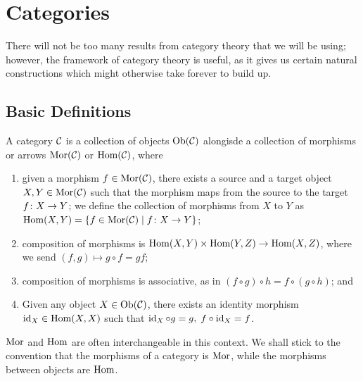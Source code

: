 \chapter{Categories}\label{ch:categories}

\begin{remark}
    There will not be too many results from category theory that we will be using;
    however, the framework of category theory is useful,
    as it gives us certain natural constructions which might otherwise take forever to build up.
\end{remark}

\section{Basic Definitions}

\begin{definition}
    A category \(\mathcal{C}\) is a collection of objects \(\operatorname{Ob}(\mathcal{C})\)
    alongisde a collection of morphisms or arrows \(\operatorname{Mor}(\mathcal{C})\) or \(\operatorname{Hom}(\mathcal{C})\),
    where
    \begin{enumerate}[label={(\roman*)}, itemsep=0mm]
        \item given a morphism \(f \in \operatorname{Mor}(\mathcal{C})\),
            there exists a source and a target object \(X,Y \in \operatorname{Mor}(\mathcal{C})\)
            such that the morphism maps from the source to the target \(f\colon X\to Y\);
            we define the collection of morphisms from \(X\) to \(Y\)
            as \(\operatorname{Hom}(X,Y) = \{f\in\operatorname{Mor}(\mathcal{C}) \mid f\colon X\to Y\}\);
        \item composition of morphisms is \(\operatorname{Hom}(X,Y) \times \operatorname{Hom}(Y,Z) \to \operatorname{Hom}(X,Z)\),
            where we send \((f,g) \mapsto g \circ f = gf\);
        \item composition of morphisms is associative, as in \((f \circ g) \circ h = f \circ (g \circ h)\); and
        \item Given any object \(X \in \operatorname{Ob}(\mathcal{C})\),
            there exists an identity morphism \(\operatorname{id}_X \in \operatorname{Hom}(X,X)\)
            such that \(\operatorname{id}_X \circ g = g,\; f \circ \operatorname{id}_X = f\).
    \end{enumerate}
\end{definition}
\begin{remark}
    \(\operatorname{Mor}\) and \(\operatorname{Hom}\) are often interchangeable in this context.
    We shall stick to the convention that the morphisms of a category is \(\operatorname{Mor}\),
    while the morphisms between objects are \(\operatorname{Hom}\).
\end{remark}

